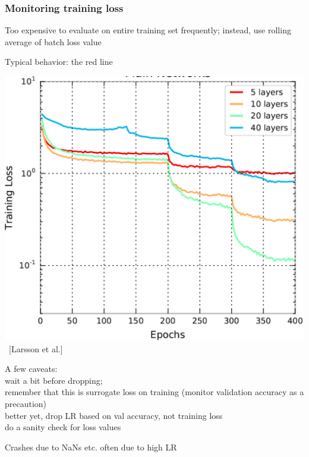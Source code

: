 \documentclass[xcolor=dvipsnames]{beamer}
\begin{document}
\begin{frame}
  \frametitle{Monitoring training loss}
  \begin{minipage}[c]{.6\linewidth}
  \bi
\item Too expensive to evaluate on entire training set frequently;
  instead, use rolling average of batch loss value
\item Typical behavior: the red line
\ei    
  \end{minipage}%
  \begin{minipage}[c]{.4\linewidth}\begin{center}
    \includegraphics[width=.97\textwidth]{lr-drops-plot-fractalnet}\\
 ~[Larsson et al.]\end{center}
  \end{minipage}
\bi
\item A few caveats:\\
wait a bit before dropping;\\
remember that this is surrogate loss on training (monitor validation
accuracy as a precaution)\\
better yet, drop LR based on val accuracy, not training loss\\
do a sanity check for loss values
\item Crashes due to NaNs etc. often due to high LR
\ei
\end{frame}
\end{document}

